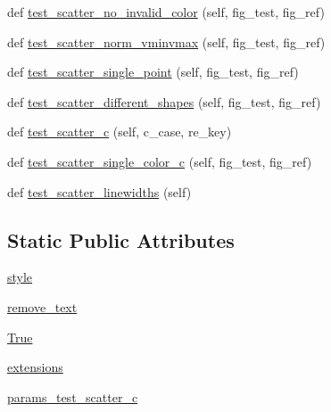 \begin{DoxyCompactItemize}
\item 
def \hyperlink{classmatplotlib_1_1tests_1_1test__axes_1_1TestScatter_a3c6b58034d55f7125e123302439ef5e6}{test\+\_\+scatter\+\_\+no\+\_\+invalid\+\_\+color} (self, fig\+\_\+test, fig\+\_\+ref)
\item 
def \hyperlink{classmatplotlib_1_1tests_1_1test__axes_1_1TestScatter_a0b3ddb89d4bb637645d0afb7034e7fcb}{test\+\_\+scatter\+\_\+norm\+\_\+vminvmax} (self, fig\+\_\+test, fig\+\_\+ref)
\item 
def \hyperlink{classmatplotlib_1_1tests_1_1test__axes_1_1TestScatter_a836ead0cba2d3012fa2910bb03661910}{test\+\_\+scatter\+\_\+single\+\_\+point} (self, fig\+\_\+test, fig\+\_\+ref)
\item 
def \hyperlink{classmatplotlib_1_1tests_1_1test__axes_1_1TestScatter_a982e43561a061ca2729e80d6a1d4af36}{test\+\_\+scatter\+\_\+different\+\_\+shapes} (self, fig\+\_\+test, fig\+\_\+ref)
\item 
def \hyperlink{classmatplotlib_1_1tests_1_1test__axes_1_1TestScatter_a304039de5a8ff400b9d5b810abbba73e}{test\+\_\+scatter\+\_\+c} (self, c\+\_\+case, re\+\_\+key)
\item 
def \hyperlink{classmatplotlib_1_1tests_1_1test__axes_1_1TestScatter_a2871784924ebaede6dfdfb3fba380c15}{test\+\_\+scatter\+\_\+single\+\_\+color\+\_\+c} (self, fig\+\_\+test, fig\+\_\+ref)
\item 
def \hyperlink{classmatplotlib_1_1tests_1_1test__axes_1_1TestScatter_a128537d56410ce7693da96b5830da006}{test\+\_\+scatter\+\_\+linewidths} (self)
\end{DoxyCompactItemize}
\subsection*{Static Public Attributes}
\begin{DoxyCompactItemize}
\item 
\hyperlink{classmatplotlib_1_1tests_1_1test__axes_1_1TestScatter_ae51173f9ed7ac38d2d437a705af2d704}{style}
\item 
\hyperlink{classmatplotlib_1_1tests_1_1test__axes_1_1TestScatter_a57ed2829c2ee6435b23c507b68f0cfea}{remove\+\_\+text}
\item 
\hyperlink{classmatplotlib_1_1tests_1_1test__axes_1_1TestScatter_a9727c719633231634050251cfc6a5555}{True}
\item 
\hyperlink{classmatplotlib_1_1tests_1_1test__axes_1_1TestScatter_a65502d64dd9ae3293ce8ca44ad49fcc8}{extensions}
\item 
\hyperlink{classmatplotlib_1_1tests_1_1test__axes_1_1TestScatter_a27825127d639ee4d544c759035949165}{params\+\_\+test\+\_\+scatter\+\_\+c}
\end{DoxyCompactItemize}


